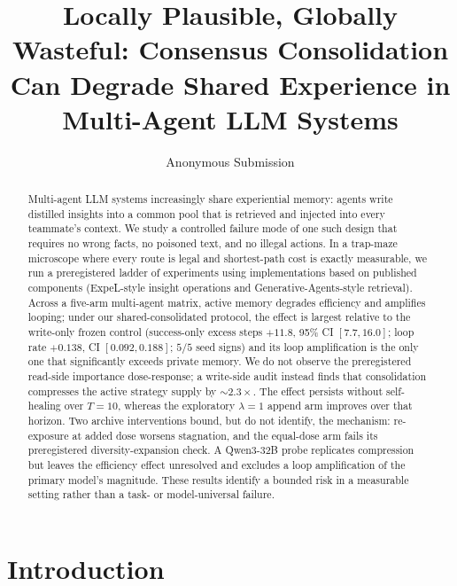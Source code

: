 \documentclass[letterpaper]{article} %
\title{Locally Plausible, Globally Wasteful: Consensus Consolidation Can Degrade Shared Experience in Multi-Agent LLM Systems}
\author{Anonymous Submission}
\begin{document}
\maketitle


\begin{abstract}
Multi-agent LLM systems increasingly share experiential memory: agents write distilled
insights into a common pool that is retrieved and injected into every teammate's context. We
study a controlled failure mode of one such design that requires no wrong facts, no poisoned
text, and no illegal actions. In a trap-maze microscope where every route is legal and
shortest-path cost is exactly measurable, we run a preregistered ladder of experiments using
implementations based on published components (ExpeL-style insight operations and
Generative-Agents-style retrieval). Across a five-arm multi-agent matrix, active memory
degrades efficiency and amplifies looping; under our shared-consolidated protocol, the effect
is largest relative to the write-only frozen control (success-only excess steps $+11.8$, 95\%
CI $[7.7,16.0]$; loop rate $+0.138$, CI $[0.092,0.188]$; $5/5$ seed signs) and its loop
amplification is the only one that significantly exceeds private memory. We do not observe the
preregistered read-side importance dose-response; a write-side audit instead finds that
consolidation compresses the active strategy supply by ${\sim}2.3\times$. The effect persists
without self-healing over $T{=}10$, whereas the exploratory $\lambda{=}1$ append arm improves
over that horizon. Two archive interventions bound, but do not identify, the mechanism:
re-exposure at added dose worsens stagnation, and the equal-dose arm fails its preregistered
diversity-expansion check. A Qwen3-32B probe replicates compression but leaves the efficiency effect
unresolved and excludes a loop amplification of the primary model's magnitude. These results
identify a bounded risk in a measurable setting rather than a task- or model-universal failure.
\end{abstract}

\section{Introduction}
\end{document}
